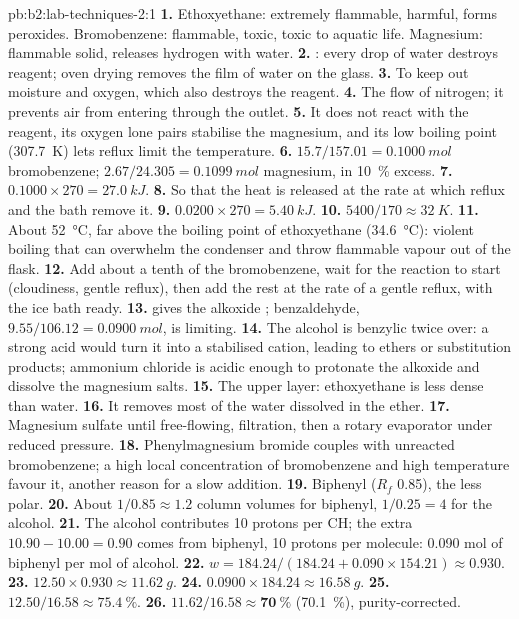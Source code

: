 \begin{solution}{pb:b2:lab-techniques-2:1}
\textbf{1.} Ethoxyethane: extremely flammable, harmful, forms peroxides. Bromobenzene: flammable, toxic,
toxic to aquatic life. Magnesium: flammable solid, releases hydrogen with water.
\textbf{2.} : every drop of water destroys reagent; oven drying
removes the film of water on the glass.
\textbf{3.} To keep out moisture and oxygen, which also destroys the reagent.
\textbf{4.} The flow of nitrogen; it prevents air from entering through the outlet.
\textbf{5.} It does not react with the reagent, its oxygen lone pairs stabilise the magnesium, and its
low boiling point (\qty{307.7}{K}) lets reflux limit the temperature.
\textbf{6.} $15.7/157.01 = \qty{0.1000}{mol}$ bromobenzene; $2.67/24.305 = \qty{0.1099}{mol}$ magnesium,
in 10~\% excess.
\textbf{7.} $0.1000 \times 270 = \qty{27.0}{kJ}$.
\textbf{8.} So that the heat is released at the rate at which reflux and the bath remove it.
\textbf{9.} $0.0200 \times 270 = \qty{5.40}{kJ}$.
\textbf{10.} $5400/170 \approx \qty{32}{K}$.
\textbf{11.} About \qty{52}{\degreeCelsius}, far above the boiling point of ethoxyethane
(\qty{34.6}{\degreeCelsius}): violent boiling that can overwhelm the condenser and throw flammable vapour
out of the flask.
\textbf{12.} Add about a tenth of the bromobenzene, wait for the reaction to start (cloudiness, gentle
reflux), then add the rest at the rate of a gentle reflux, with the ice bath ready.
\textbf{13.}  gives the alkoxide ; benzaldehyde,
$9.55/106.12 = \qty{0.0900}{mol}$, is limiting.
\textbf{14.} The alcohol is benzylic twice over: a strong acid would turn it into a stabilised cation,
leading to ethers or substitution products; ammonium chloride is acidic enough to protonate the alkoxide
and dissolve the magnesium salts.
\textbf{15.} The upper layer: ethoxyethane is less dense than water.
\textbf{16.} It removes most of the water dissolved in the ether.
\textbf{17.} Magnesium sulfate until free-flowing, filtration, then a rotary evaporator under reduced
pressure.
\textbf{18.} Phenylmagnesium bromide couples with unreacted bromobenzene; a high local concentration of
bromobenzene and high temperature favour it, another reason for a slow addition.
\textbf{19.} Biphenyl ($R_f$ 0.85), the less polar.
\textbf{20.} About $1/0.85 \approx 1.2$ column volumes for biphenyl, $1/0.25 = 4$ for the alcohol.
\textbf{21.} The alcohol contributes 10  protons per CH; the extra $10.90 - 10.00 = 0.90$ comes from
biphenyl, 10 protons per molecule: 0.090 mol of biphenyl per mol of alcohol.
\textbf{22.} $w = 184.24/(184.24 + 0.090 \times 154.21) \approx 0.930$.
\textbf{23.} $12.50 \times 0.930 \approx \qty{11.62}{g}$.
\textbf{24.} $0.0900 \times 184.24 \approx \qty{16.58}{g}$.
\textbf{25.} $12.50/16.58 \approx 75.4~\%$.
\textbf{26.} $11.62/16.58 \approx \boldsymbol{70~\%}$ (70.1~\%), purity-corrected.
\end{solution}
